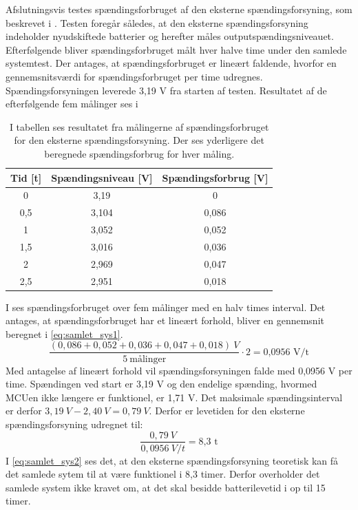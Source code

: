 Afslutningsvis testes spændingsforbruget af den eksterne spændingsforsyning, som beskrevet i . Testen foregår således, at den eksterne spændingsforsyning indeholder nyudskiftede batterier og herefter måles outputspændingsniveauet. Efterfølgende bliver spændingsforbruget målt hver halve time under den samlede systemtest. Der antages, at spændingsforbruget er lineært faldende, hvorfor en gennemsnitsværdi for spændingsforbruget per time udregnes. \\
Spændingsforsyningen leverede 3,19 V fra starten af testen. Resultatet af de efterfølgende fem målinger ses i 
\begin{table}[H]
	\centering
	\begin{tabular}{ccc}
		\hline
		\cellcolor[HTML]{C0C0C0}Tid {[}t{]} & \cellcolor[HTML]{C0C0C0} Spændingsniveau {[}V{]} & \cellcolor[HTML]{C0C0C0}Spændingsforbrug {[}V{]} \\ \hline
		0 & 3,19 & 0 \\ \hline	
		0,5 & 3,104 & 0,086 \\ \hline	
		1 & 3,052 & 0,052 \\ \hline
		1,5 & 3,016 & 0,036 \\ \hline
		2 & 2,969 & 0,047 \\ \hline
		2,5 & 2,951 & 0,018 \\ \hline
	\end{tabular}
	\caption{I tabellen ses resultatet fra målingerne af spændingsforbruget for den eksterne spændingsforsyning. Der ses yderligere det beregnede spændingsforbrug for hver måling.}
	\label{tab:samlet_sys_batteri}
\end{table}\vspace{-.25cm}
I  ses spændingsforbruget over fem målinger med en halv times interval. Det antages, at spændingsforbruget har et lineært forhold, bliver en gennemsnit beregnet i \eqref{eq:samlet_sys1}.
\begin{equation}
\frac{(0,086 + 0,052 + 0,036 + 0,047 + 0,018)~V}{5~\text{målinger}} \cdot 2 = \text{0,0956~V/t}
\label{eq:samlet_sys1}
\end{equation}
Med antagelse af lineært forhold vil spændingsforsyningen falde med 0,0956 V per time. Spændingen ved start er 3,19 V og den endelige spænding, hvormed MCUen ikke længere er funktionel, er 1,71 V. Det maksimale spændingsinterval er derfor $3,19~V - 2,40~V = 0,79~V$. Derfor er levetiden for den eksterne spændingsforsyning udregnet til:
\begin{equation}
\frac{0,79~V}{0,0956~V/t} = \text{8,3~t}
\label{eq:samlet_sys2}
\end{equation}
I \eqref{eq:samlet_sys2} ses det, at den eksterne spændingsforsyning teoretisk kan få det samlede sytem til at være funktionel i 8,3 timer. Derfor overholder det samlede system ikke kravet om, at det skal besidde batterilevetid i op til 15 timer. 
